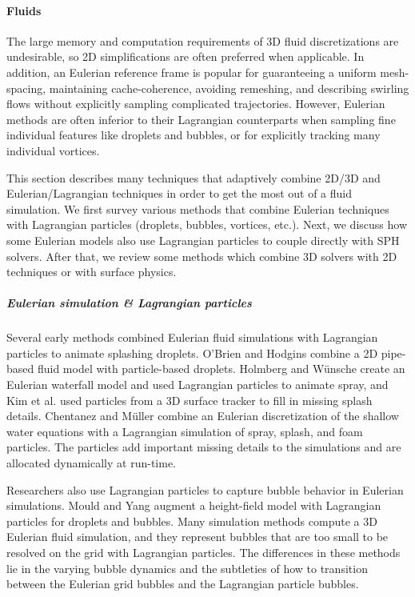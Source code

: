 \paragraph{Fluids}

The large memory and computation requirements of 3D fluid discretizations are undesirable, so 2D simplifications are often preferred when applicable. In addition, an Eulerian reference frame is popular for guaranteeing a uniform mesh-spacing, maintaining cache-coherence, avoiding remeshing, and describing swirling flows without explicitly sampling complicated trajectories. However, Eulerian methods are often inferior to their Lagrangian counterparts when sampling fine individual features like droplets and bubbles, or for explicitly tracking many individual vortices.

This section describes many techniques that adaptively combine 2D/3D and Eulerian/Lagrangian techniques in order to get the most out of a fluid simulation. We first survey various methods that combine Eulerian techniques with Lagrangian particles (droplets, bubbles, vortices, etc.). Next, we discuss how some Eulerian models also use Lagrangian particles to couple directly with SPH solvers. After that, we review some methods which combine 3D solvers with 2D techniques or with surface physics.

\subparagraph*{Eulerian simulation \& Lagrangian particles}

Several early methods combined Eulerian fluid simulations with Lagrangian particles to animate splashing droplets. O'Brien and Hodgins \cite{OBrien1995} combine a 2D pipe-based fluid model with particle-based droplets. Holmberg and W\"unsche \cite{Holmberg2004} create an Eulerian waterfall model and used Lagrangian particles to animate spray, and Kim et al. \cite{Kim2006} used particles from a 3D surface tracker to fill in missing splash details. Chentanez and M\"uller \cite{Chentanez2010} combine an Eulerian discretization of the shallow water equations with a Lagrangian simulation of spray, splash, and foam particles. The particles add important missing details to the simulations and are allocated dynamically at run-time.

Researchers also use Lagrangian particles to capture bubble behavior in Eulerian simulations. Mould and Yang \cite{Mould1997} augment a height-field model with Lagrangian particles for droplets and bubbles. Many simulation methods \cite{Greenwood:2004:BBE:1028523.1028562,Hong2008Bubbles,Patkar2013} compute a 3D Eulerian fluid simulation, and they represent bubbles that are too small to be resolved on the grid with Lagrangian particles. The differences in these methods lie in the varying bubble dynamics and the subtleties of how to transition between the Eulerian grid bubbles and the Lagrangian particle bubbles.

